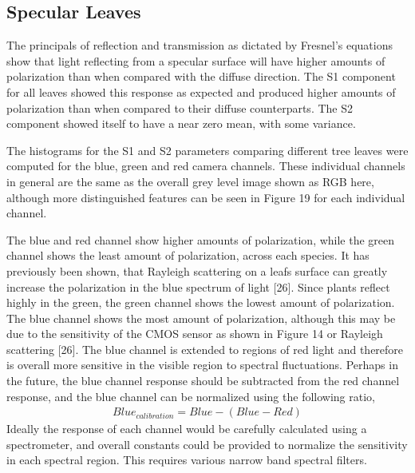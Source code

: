\subsection{Specular Leaves}
The principals of reflection and transmission as dictated by Fresnel’s equations show that light reflecting from a specular surface will have higher amounts of polarization than when compared with the diffuse direction.  The S1 component for all leaves showed this response as expected and produced higher amounts of polarization than when compared to their diffuse counterparts.  The S2 component showed itself to have a near zero mean, with some variance.

The histograms for the S1 and S2 parameters comparing different tree leaves were computed for the blue, green and red camera channels.  These individual channels in general are the same as the overall grey level image shown as RGB here, although more distinguished features can be seen in Figure 19 for each individual channel.
%
\begin{center}
\end{center}
%
The blue and red channel show higher amounts of polarization, while the green channel shows the least amount of polarization, across each species.  It has previously been shown, that Rayleigh scattering on a leafs surface can greatly increase the polarization in the blue spectrum of light [26].  Since plants reflect highly in the green, the green channel shows the lowest amount of polarization.  The blue channel shows the most amount of polarization, although this may be due to the sensitivity of the CMOS sensor as shown in Figure 14 or Rayleigh scattering [26].  The blue channel is extended to regions of red light and therefore is overall more sensitive in the visible region to spectral fluctuations.  Perhaps in the future, the blue channel response should be subtracted from the red channel response, and the blue channel can be normalized using the following ratio,
%
\begin{align}
    Blue_{calibration} = Blue - (Blue - Red)
\end{align}
%
Ideally the response of each channel would be carefully calculated using a spectrometer, and overall constants could be provided to normalize the sensitivity in each spectral region.  This requires various narrow band spectral filters.

